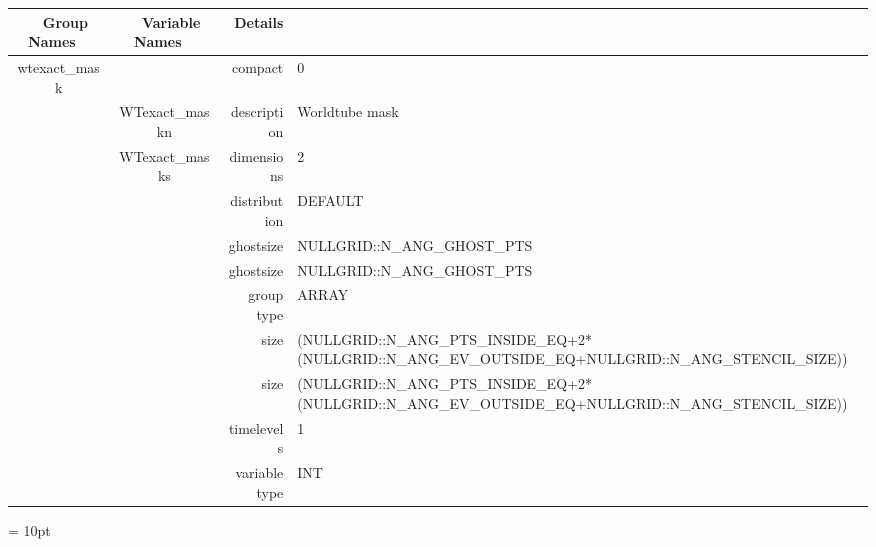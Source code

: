 \begin{tabular*}{150mm}{|c|c@{\extracolsep{\fill}}|rl|} \hline 
~ {\bf Group Names} ~ & ~ {\bf Variable Names} ~  &{\bf Details} ~ & ~ \\ 
\hline 
wtexact\_mask &  & compact & 0 \\ 
 & WTexact\_maskn & description & Worldtube mask \\ 
 & WTexact\_masks & dimensions & 2 \\ 
 &  & distribution & DEFAULT \\ 
 &  & ghostsize & NULLGRID::N\_ANG\_GHOST\_PTS \\ 
& ~ & ghostsize & NULLGRID::N\_ANG\_GHOST\_PTS \\ 
 &  & group type & ARRAY \\ 
 &  & size & (NULLGRID::N\_ANG\_PTS\_INSIDE\_EQ+2*(NULLGRID::N\_ANG\_EV\_OUTSIDE\_EQ+NULLGRID::N\_ANG\_STENCIL\_SIZE)) \\ 
& ~ & size & (NULLGRID::N\_ANG\_PTS\_INSIDE\_EQ+2*(NULLGRID::N\_ANG\_EV\_OUTSIDE\_EQ+NULLGRID::N\_ANG\_STENCIL\_SIZE)) \\ 
 &  & timelevels & 1 \\ 
 &  & variable type & INT \\ 
\hline 
\end{tabular*} 



\vspace{5mm}\parskip = 10pt 
